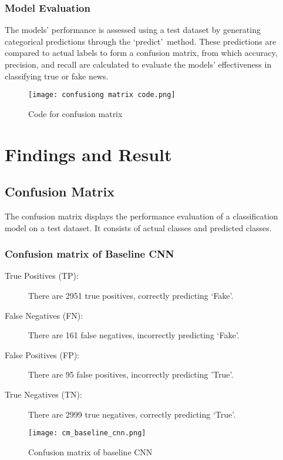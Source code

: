 \subsubsection{Model Evaluation} 
The models' performance is assessed using a test dataset by generating categorical predictions through the \lq predict\rq\  method. These predictions are compared to actual labels to form a confusion matrix, from which accuracy, precision, and recall are calculated to evaluate the models' effectiveness in classifying true or fake news.

\begin{figure}[h]
    \centering
    \texttt{[image: confusiong matrix code.png]}
    \caption{Code for confusion matrix}    
\end{figure}

\section{Findings and Result}

\subsection{Confusion Matrix}
The confusion matrix displays the performance evaluation of a classification model on a test dataset. It consists of actual classes and predicted classes.

\subsubsection{Confusion matrix of Baseline CNN}

\begin{description}
    \item[True Positives (TP):] There are 2951 true positives, correctly predicting ‘Fake’.
    \item[False Negatives (FN):] There are 161 false negatives, incorrectly predicting ‘Fake’.
    \item[False Positives (FP):] There are 95 false positives, incorrectly predicting 'True'.
    \item[True Negatives (TN): ] There are 2999 true negatives, correctly predicting ‘True’.
\end{description}

\begin{figure}[h]
    \centering
    \texttt{[image: cm\_baseline\_cnn.png]}
    \caption{Confusion matrix of baseline CNN}    
\end{figure}

